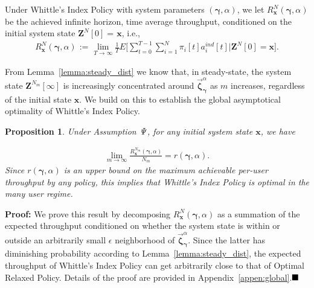 \documentclass[11pt,twocolumn]{IEEEtran}
\newtheorem{proposition}{Proposition}
\begin{document}
\vspace{3pt} Under Whittle's Index Policy with system parameters
$(\bm \gamma, \alpha)$, we let $R^{N}_{\bm x}(\bm \gamma, \alpha)$ be
the achieved infinite horizon, time average throughput, conditioned
on the initial system state ${\bm Z}^N[0]{=}\hspace{1pt} \bm x$,
i.e.,
\begin{align}
\nonumber R^{N}_{\bm x}(\bm \gamma,
\alpha)\hspace{1pt}{:=}\hspace{1pt}\lim_{T\rightarrow \infty}
\frac{1}{T}E \Big[\sum_{t=0}^{T-1} \sum_{i=1}^{N} \pi_i[t]
a_i^{ind}[t] \Big|{\bm Z}^{N}[0]={\bm x} \Big].
\end{align}

\vspace{-5pt}From Lemma~\ref{lemma:steady_dist} we know that, in steady-state,
the system state $\bm Z^{N_m}[\infty]$ is increasingly
concentrated around $\vec{\bm \zeta}^{\alpha}_{\bm \gamma}$ as $m$
increases, regardless of the initial state ${\bm x}.$ We build on
this to establish the global asymptotical optimality of Whittle's
Index Policy.



\begin{proposition}
\label{prop:asymp} Under Assumption $\it \Psi$, for any initial
system state $\bm x$, we have

\vspace{-12pt}\begin{align}
\lim_{m \rightarrow \infty} \frac{R^{N_m}_{\bm x}(\bm \gamma, \alpha)}{N_m} = r(\bm \gamma, \alpha). \nonumber
\end{align}
Since $r(\bm \gamma, \alpha)$ is an upper bound on the maximum
achievable per-user throughput by any policy, this implies that
Whittle's Index Policy is optimal in the many user regime.
\end{proposition}

\noindent \textbf{Proof:} We prove this result by decomposing $R^{N}_{\bm x}(\bm \gamma,
\alpha)$ as a summation of the expected throughput conditioned on whether the system state is within or outside an arbitrarily small $\epsilon$ neighborhood of $\vec{\bm \zeta}^{\alpha}_{\bm \gamma}$. Since the latter has diminishing probability according to Lemma~\ref{lemma:steady_dist}, the expected throughput of Whittle's Index Policy can get arbitrarily close to that of Optimal Relaxed Policy. Details of the proof are provided in Appendix~\ref{appen:global}.$\hfill \blacksquare$ \vspace{3pt}
\end{document}
